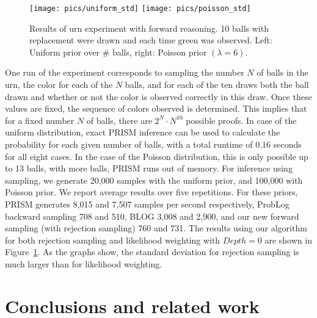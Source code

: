 \documentclass{tlp}
\begin{document}
\begin{figure}[t]
  \centering
  \texttt{[image: pics/uniform\_std]}
  \texttt{[image: pics/poisson\_std]}
  \caption{Results of urn experiment with forward reasoning. 10 balls
    with replacement were drawn and each time green was
    observed. Left: Uniform prior over \# balls, right: Poisson prior
    $(\lambda=6)$.}
  \label{fig:urnproblog}
\end{figure}

One run of the experiment corresponds to sampling the number $N$ of
balls in the urn, the color for each of the $N$ balls, and for each of
the ten draws both the ball drawn and whether or not the color is
observed correctly in this draw. Once these values are fixed, the
sequence of colors observed is determined. This implies that for a
fixed number $N$ of balls, there are $2^N\cdot N^{10}$ possible
proofs.  In case of the uniform distribution, exact PRISM inference
can be used to calculate the probability for each given number of
balls, with a total runtime of $0.16$ seconds for all eight cases. In
the case of the Poisson distribution, this is only possible up to 13
balls, with more balls, PRISM runs out of memory.  For inference using
sampling, we generate 20,000 samples with the uniform prior, and
100,000 with Poisson prior. We report average results over five
repetitions.  For these priors, PRISM generates 8,015 and 7,507
samples per second respectively, ProbLog backward sampling 708 and
510, BLOG 3,008 and 2,900, and our new forward sampling (with
rejection sampling) 760 and 731.  The results using our algorithm for
both rejection sampling and likelihood weighting with $Depth=0$ are
shown in Figure~\ref{fig:urnproblog}. As the graphs show, the standard
deviation for rejection sampling is much larger than for likelihood weighting.



\section{Conclusions and related work}
\label{sec:conclusions}
\end{document}

